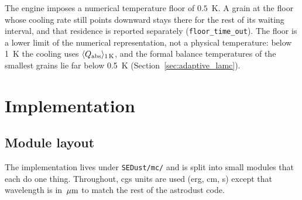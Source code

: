\documentclass{my_memo}
\newcommand{\Qabs}{Q_{\rm abs}}
\newcommand{\umc}{\,\mu{\rm m}}
\begin{document}
The engine imposes a numerical temperature floor of $0.5$~K. A grain
at the floor whose cooling rate still points downward stays there for
the rest of its waiting interval, and that residence is reported
separately (\texttt{floor\_time\_out}). The floor is a lower limit of
the numerical representation, not a physical temperature: below 1~K
the cooling uses $\langle\Qabs\rangle_{1\,\rm K}$, and the formal
balance temperatures of the smallest grains lie far below 0.5~K
(Section~\ref{sec:adaptive_lamc}).

\section{Implementation}\label{sec:impl}

\subsection{Module layout}

The implementation lives under \verb|SEDust/mc/| and is split
into small modules that each do one thing.  Throughout, cgs units
are used (erg, cm, s) except that wavelength is in $\umc$ to match
the rest of the astrodust code.
\end{document}

